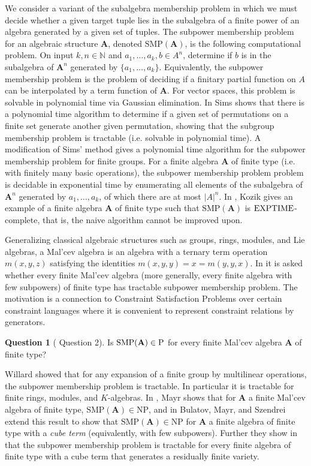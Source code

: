 \documentclass[12pt]{amsart}
\numberwithin{equation}{section}
\theoremstyle{plain}
\theoremstyle{definition}
\newtheorem{que}[theorem]{Question}
\newcommand{\A}{\mathbf{A}}
\newcommand{\N}{\mathbb{N}}
\newcommand{\SMP}{\text{SMP}}
\begin{document}
We consider a variant of the subalgebra membership problem in which we must decide whether a given target tuple 
  lies in the subalgebra of a finite power of an algebra generated by a given set of tuples.
The subpower membership problem for an algebraic structure $\A$, denoted $\SMP(\A)$, 
  is the following computational problem.
On input $k,n \in \N$ and $a_1,\ldots,a_k,b \in A^n$, determine if $b$ is in the subalgebra of $\A^n$ 
  generated by $\{ a_1, \ldots, a_k \}$.
Equivalently, the subpower membership problem is the problem of deciding if 
  a finitary partial function on $A$ can be interpolated by a term function of $\A$. 
For vector spaces, this problem is solvable in polynomial time via Gaussian elimination.
In \cite{Si:CMPG} Sims shows that there is a polynomial time algorithm to determine 
 if a given set of permutations on a finite set generate another given permutation, 
 showing that the subgroup membership problem is tractable (i.e. solvable in polynomial time).
A modification of Sims' method gives a polynomial time algorithm for the subpower membership problem for finite groups. 
For a finite algebra $\A$ of finite type (i.e. with finitely many basic operations), 
  the subpower membership problem problem is decidable in exponential time by enumerating 
  all elements of the subalgebra of $\A^n$ generated by $a_1, \ldots, a_k$, 
  of which there are at most $|A|^n$. 
In \cite{Ko:EXP}, Kozik gives an example of a finite algebra $\A$ of finite type
  such that $\SMP(\A)$ is $\textup{EXPTIME}$-complete, 
  that is, the naive algorithm cannot be improved upon.

Generalizing classical algebraic structures such as groups, rings, modules, and Lie algebras, 
  a Mal'cev algebra is an algebra with a ternary term operation $m(x,y,z)$ satisfying the identities 
  $m(x,y,y) = x = m(y,y,x)$.
In \cite{IMMVW:TL} it is asked whether every finite Mal'cev algebra 
  (more generally, every finite algebra with few subpowers) 
  of finite type has tractable subpower membership problem.
The motivation is a connection to Constraint Satisfaction Problems over certain constraint languages 
  where it is convenient to represent constraint relations by generators.


\begin{que}[\cite{IMMVW:TL} Question 2] \label{que:SMP} 
  Is $\textup{SMP}(\A) \in \textup{P}$ for every finite Mal'cev algebra $\A$ of finite type?
\end{que}

Willard \cite{Wi:SMP} showed that for any expansion of a finite group by multilinear operations, 
  the subpower membership problem is tractable.
In particular it is tractable for finite rings, modules, and $K$-algebras.
In \cite{Ma:SMP}, Mayr shows that for $\A$ a finite Mal'cev algebra of finite type, 
  $\SMP(\A) \in \text{NP}$, and in \cite{BMS:SMP} Bulatov, Mayr, and Szendrei 
  extend this result to show that $\SMP(\A) \in \text{NP}$ for $\A$ a finite algebra 
  of finite type with a \emph{cube term} (equivalently, with few subpowers).
Further they show in \cite{BMS:SMP} that the subpower membership problem is tractable 
  for every finite algebra of finite type with a cube term that generates a residually finite variety. 
\end{document}
